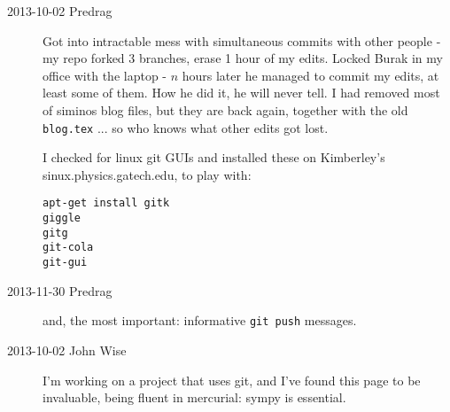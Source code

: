 \begin{description}
\item[2013-10-02 Predrag] Got into intractable mess with simultaneous commits with other
people - my repo forked 3 branches, erase 1 hour of my edits. Locked Burak in my office
with the laptop - $n$ hours later he managed to commit my edits, at least some of them.
How he did it, he will never tell.
I had removed most of siminos blog files, but they are back again, together with the old
\texttt{blog.tex} ... so who knows what
other edits got lost.

I checked for linux
\HREF{} {git GUIs} and installed these on Kimberley's sinux.physics.gatech.edu,
to play with:

\texttt{apt-get install gitk}
\\
     \texttt{giggle}
\\
     \texttt{gitg}
\\
    \texttt{git-cola}
 \\
    \texttt{git-gui}

\item[2013-11-30 Predrag] and, the most important:
 {informative} \texttt{git push} messages.

\item[2013-10-02 John Wise]
I'm working on a project that uses git, and I've found this page to be
invaluable, being fluent in mercurial:
 {sympy}
is essential.

\end{description}
